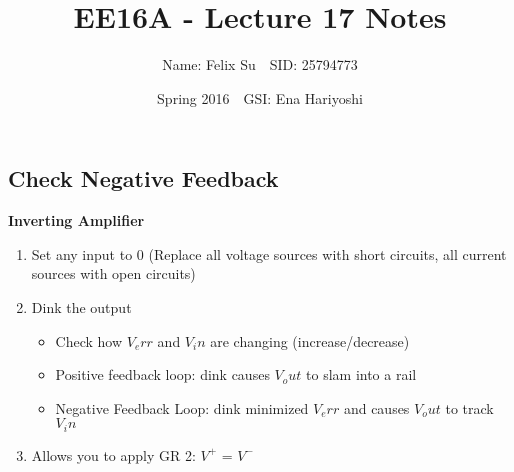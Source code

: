 \documentclass{article}\usepackage{amsmath,amssymb,amsthm,tikz,tkz-graph,color,chngpage,soul,hyperref,csquotes,graphicx,floatrow}\newcommand*{\QEDB}{\hfill\ensuremath{\square}}\newtheorem*{prop}{Proposition}\renewcommand{\theenumi}{\alph{enumi}}\usepackage[shortlabels]{enumitem}\usepackage[nobreak=true]{mdframed}\usetikzlibrary{matrix,calc}\MakeOuterQuote{"}\usepackage[margin=0.75in]{geometry} \newtheorem{theorem}{Theorem}
\title{EE16A - Lecture 17 Notes}
\author{Name: Felix Su$\quad$SID: 25794773}
\date{Spring 2016$\quad$GSI: Ena Hariyoshi}
\begin{document}
\maketitle

\subsection*{Check Negative Feedback}
\textbf{Inverting Amplifier}
\begin{enumerate}[1.]
    \item Set any input to 0 (Replace all voltage sources with short circuits, all current sources with open circuits)
    \item Dink the output
    \begin{itemize}
        \item Check how $V_err$ and $V_in$ are changing (increase/decrease)
        \item Positive feedback loop: dink causes $V_out$ to slam into a rail
        \item Negative Feedback Loop: dink minimized $V_err$ and causes $V_out$ to track $V_in$
    \end{itemize}
    \item Allows you to apply GR 2: $V^+$ = $V^-$
\end{enumerate}
\end{document}
